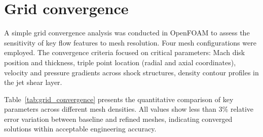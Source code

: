 \documentclass[12pt]{article}
\begin{document}
\section{Grid convergence}\label{sec:conv}
A simple grid convergence analysis was conducted in OpenFOAM to assess the sensitivity of key flow features to mesh resolution. Four mesh configurations were employed.
The convergence criteria focused on critical parameters: Mach disk position and thickness, triple point location (radial and axial coordinates), velocity and pressure gradients across shock structures, density contour profiles in the jet shear layer.

Table~\ref{tab:grid_convergence} presents the quantitative comparison of key parameters across different mesh densities. All values show less than 3\% relative error variation between baseline and refined meshes, indicating converged solutions within acceptable engineering accuracy.

\begin{table}[H]
\centering
\caption{Grid convergence study results.}
\label{tab:grid_convergence}
\end{table}
\end{document}
